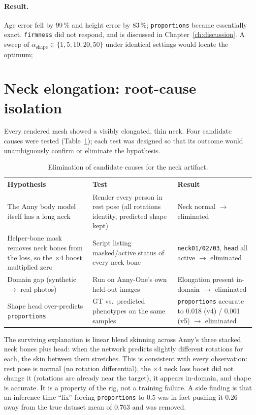 \paragraph{Result.} Age error fell by 99\,\% and height error by 83\,\%;
\texttt{proportions} became essentially exact. \texttt{firmness} did not
respond, and is discussed in Chapter~\ref{ch:discussion}. A sweep of
$\alpha_{\text{shape}}\in\{1,5,10,20,50\}$ under identical settings would
locate the optimum; 

\section{Neck elongation: root-cause isolation}
\label{sec:neck}

Every rendered mesh showed a visibly elongated, thin neck. Four candidate
causes were tested (Table~\ref{tab:neck}); each test was designed so that its
outcome would unambiguously confirm or eliminate the hypothesis.

\begin{table}[h]
\centering\small
\begin{tabular}{p{3.2cm}p{5.2cm}p{4.6cm}}
\toprule
Hypothesis & Test & Result \\
\midrule
The Anny body model itself has a long neck &
Render every person in rest pose (all rotations identity, predicted shape kept) &
Neck normal $\rightarrow$ eliminated \\
Helper-bone mask removes neck bones from the loss, so the $\times4$ boost multiplied zero &
Script listing masked/active status of every neck bone &
\texttt{neck01/02/03}, \texttt{head} all active $\rightarrow$ eliminated \\
Domain gap (synthetic $\rightarrow$ real photos) &
Run on Anny-One's own held-out images &
Elongation present in-domain $\rightarrow$ eliminated \\
Shape head over-predicts \texttt{proportions} &
GT vs.\ predicted phenotypes on the same samples &
\texttt{proportions} accurate to 0.018 (v4) / 0.001 (v5) $\rightarrow$ eliminated \\
\bottomrule
\end{tabular}
\caption{Elimination of candidate causes for the neck artifact.}
\label{tab:neck}
\end{table}

The surviving explanation is linear blend skinning across Anny's three stacked
neck bones plus head: when the network predicts slightly different rotations
for each, the skin between them stretches. This is consistent with every
observation: rest pose is normal (no rotation differential), the $\times4$ neck
loss boost did not change it (rotations are already near the target), it appears
in-domain, and shape is accurate. It is a property of the rig, not a training
failure. A side finding is that an inference-time ``fix'' forcing
\texttt{proportions} to 0.5 was in fact pushing it 0.26 away from the true
dataset mean of 0.763 and was removed.

